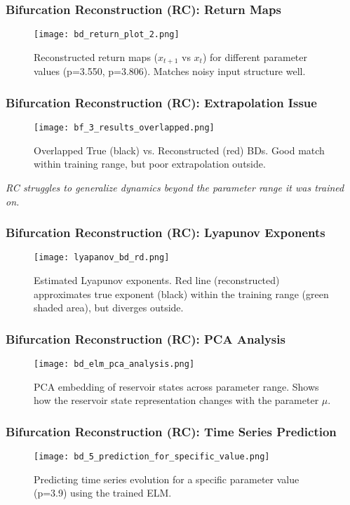 \documentclass{beamer}
\begin{document}
\begin{frame}
    \frametitle{Bifurcation Reconstruction (RC): Return Maps}
     \begin{figure}
        \centering
        \texttt{[image: bd\_return\_plot\_2.png]}
        \caption{Reconstructed return maps ($x_{t+1}$ vs $x_t$) for different parameter values (p=3.550, p=3.806). Matches noisy input structure well.}
        \label{fig:bd_2_slide}
    \end{figure}
\end{frame}


\begin{frame}
    \frametitle{Bifurcation Reconstruction (RC): Extrapolation Issue}
     \begin{figure}
        \centering
        \texttt{[image: bf\_3\_results\_overlapped.png]}
        \caption{Overlapped True (black) vs. Reconstructed (red) BDs. Good match within training range, but poor extrapolation outside.}
        \label{fig:bd_3_slide}
    \end{figure}
    \textit{RC struggles to generalize dynamics beyond the parameter range it was trained on.}
\end{frame}

\begin{frame}
    \frametitle{Bifurcation Reconstruction (RC): Lyapunov Exponents}
     \begin{figure}
        \centering
        \texttt{[image: lyapanov\_bd\_rd.png]}
        \caption{Estimated Lyapunov exponents. Red line (reconstructed) approximates true exponent (black) within the training range (green shaded area), but diverges outside.}
        \label{fig:lypanov_bd_rc_slide}
    \end{figure}
\end{frame}

\begin{frame}
    \frametitle{Bifurcation Reconstruction (RC): PCA Analysis}
     \begin{figure}
        \centering
        \texttt{[image: bd\_elm\_pca\_analysis.png]}
        \caption{PCA embedding of reservoir states across parameter range. Shows how the reservoir state representation changes with the parameter $\mu$.}
        \label{fig:bd_4_slide}
    \end{figure}
\end{frame}


\begin{frame}
    \frametitle{Bifurcation Reconstruction (RC): Time Series Prediction}
     \begin{figure}
        \centering
        \texttt{[image: bd\_5\_prediction\_for\_specific\_value.png]}
        \caption{Predicting time series evolution for a specific parameter value (p=3.9) using the trained ELM.}
        \label{fig:bd_5_slide}
    \end{figure}
\end{frame}
\end{document}
